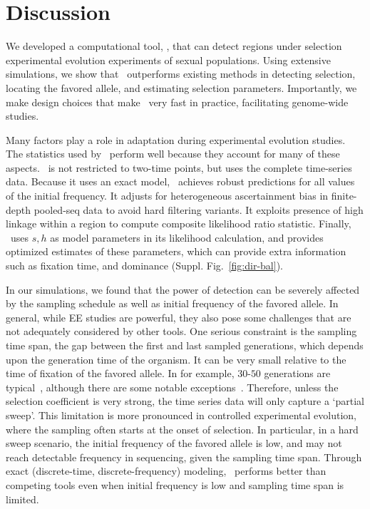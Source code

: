\section{Discussion}
We developed a computational tool, \comale, that can detect regions
under selection experimental evolution experiments of sexual
populations. Using extensive simulations, we show that \comale\
outperforms existing methods in detecting selection, locating the
favored allele, and estimating selection parameters. Importantly, we
make design choices that make \comale\ very fast in practice,
facilitating genome-wide studies.


Many factors play a role in adaptation during experimental evolution
studies. The statistics used by \comale\ perform well because they
account for many of these aspects. \comale\ is not restricted to
two-time points, but uses the complete time-series data. Because it
uses an exact model, \comale\ achieves robust predictions for all
values of the initial frequency. It adjusts for heterogeneous
ascertainment bias in finite-depth pooled-seq data to avoid hard
filtering variants. It exploits presence of high linkage within a
region to compute composite likelihood ratio statistic. Finally,
\comale\ uses $s,h$ as model parameters in its likelihood calculation,
and provides optimized estimates of these parameters, which can
provide extra information such as fixation time, and dominance (Suppl. 
Fig.~\ref{fig:dir-bal}).

In our simulations, we found that the power of detection can be
severely affected by the sampling schedule as well as initial
frequency of the favored allele.  In general, while EE studies are
powerful, they also pose some challenges that are not adequately
considered by other tools. One serious constraint is the sampling time
span, the gap between the first and last sampled generations, which
depends upon the generation time of the organism. It can be very small
relative to the time of fixation of the favored allele. In \dmel for
example, $30$-$50$ generations are typical~\cite{kofler2013guide},
although there are some notable
exceptions~\cite{zhou2011experimental}.  Therefore, unless the
selection coefficient is very strong, the time series data will only
capture a `partial sweep'. This limitation is more pronounced in
controlled experimental evolution, where the sampling often starts at
the onset of selection. In particular, in a hard sweep scenario, the
initial frequency of the favored allele is low, and may not reach
detectable frequency in sequencing, given the sampling time
span. Through exact (discrete-time, discrete-frequency) modeling,
\comale\ performs better than competing tools even when initial
frequency is low and sampling time span is limited.



